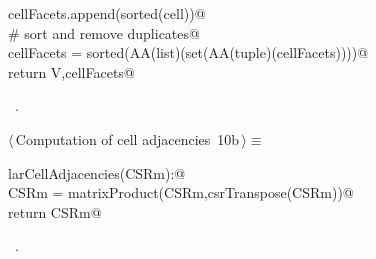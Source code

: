 \documentclass[11pt,oneside]{article}	%
\begin{document}
\begin{flushleft}
\begin{list}{}{}
\mbox{}\verb@                cellFacets.append(sorted(cell))@\\
\mbox{}\verb@    # sort and remove duplicates@\\
\mbox{}\verb@    cellFacets = sorted(AA(list)(set(AA(tuple)(cellFacets))))@\\
\mbox{}\verb@    return V,cellFacets@\\
\mbox{}\verb@@{\NWsep}
\end{list}
\vspace{-1ex}
\footnotesize\addtolength{\baselineskip}{-1ex}
\begin{list}{}{\setlength{\itemsep}{-\parsep}\setlength{\itemindent}{-\leftmargin}}
\item \NWtxtMacroRefIn\ .
\end{list}
\end{flushleft}
\begin{flushleft} \small \label{scrap19}
\protect{}$\langle\,$Computation of cell adjacencies\nobreak\ {\footnotesize 10b}$\,\rangle\equiv$
\vspace{-1ex}
\begin{list}{}{} \item
\mbox{}\verb@def larCellAdjacencies(CSRm):@\\
\mbox{}\verb@    CSRm = matrixProduct(CSRm,csrTranspose(CSRm))@\\
\mbox{}\verb@    return CSRm@\\
\mbox{}\verb@@{\NWsep}
\end{list}
\vspace{-1ex}
\footnotesize\addtolength{\baselineskip}{-1ex}
\begin{list}{}{\setlength{\itemsep}{-\parsep}\setlength{\itemindent}{-\leftmargin}}
\item \NWtxtMacroRefIn\ .
\end{list}
\end{flushleft}
\end{document}
